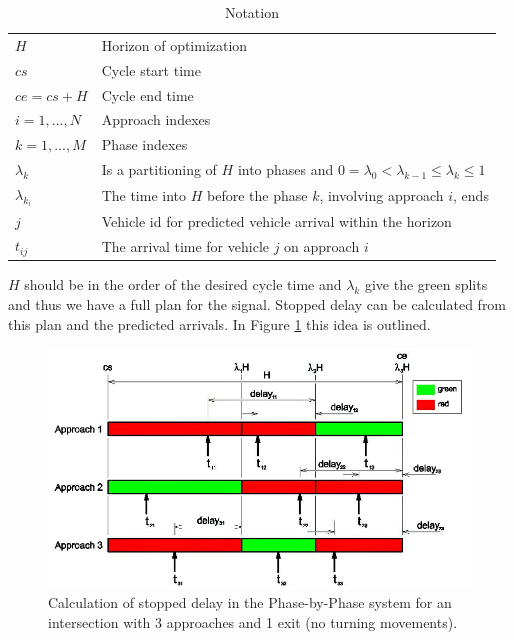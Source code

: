 \begin{table}[!ht]
\begin{center}
\begin{tabular}{ll}
\hline
$H$ & Horizon of optimization \\
$cs$ & Cycle start time \\
$ce = cs+H$ & Cycle end time \\
$i = 1,...,N$ & Approach indexes \\
$k = 1,...,M$ & Phase indexes \\
$\lambda_k$ &  Is a partitioning of $H$ into phases and $0 = \lambda_{0} <  \lambda_{k-1} \leq \lambda_k \leq 1$ \\
$\lambda_{k_i}$ & The time into $H$ before the phase $k$, involving approach $i$, ends \\
$j$ & Vehicle id for predicted vehicle arrival within the horizon  \\
$t_{ij}$ & The arrival time for vehicle $j$ on approach $i$
\\ \hline
\end{tabular}
\end{center}
\caption{Notation}
\end{table}

$H$ should be in the order of the desired cycle time and $\lambda_k$
give the green splits and thus we have a full plan for the
signal. Stopped delay can be calculated from this plan and the
predicted arrivals. In Figure \ref{fig:pp_delay} this idea is
outlined.

\begin{figure}[!ht]
\begin{center}
\includegraphics[scale=0.5]{phase-by-phase_delay-model.png} 
\end{center}
\caption{Calculation of stopped delay in the Phase-by-Phase system for an intersection with 3 approaches and 1 exit (no turning movements).}
\label{fig:pp_delay}
\end{figure}

